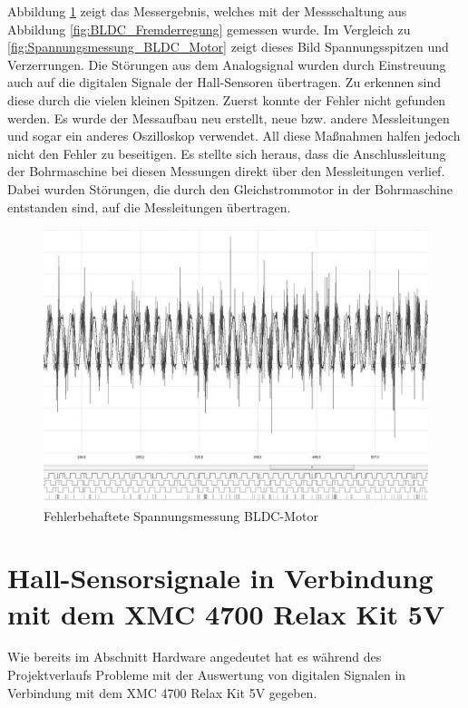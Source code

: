 Abbildung \ref{fig:Fehlerbehaftete_Spannungsmessung_BLDC_Motor} zeigt das Messergebnis, welches mit der Messschaltung aus Abbildung \ref{fig:BLDC_Fremderregung} gemessen wurde.
Im Vergleich zu \ref{fig:Spannungsmessung_BLDC_Motor} zeigt dieses Bild Spannungsspitzen und Verzerrungen.
Die Störungen aus dem Analogsignal wurden durch Einstreuung auch auf die digitalen Signale der Hall-Sensoren übertragen.
Zu erkennen sind diese durch die vielen kleinen Spitzen.
Zuerst konnte der Fehler nicht gefunden werden.
Es wurde der Messaufbau neu erstellt, neue bzw. andere Messleitungen und sogar ein anderes Oszilloskop verwendet.
All diese Maßnahmen halfen jedoch nicht den Fehler zu beseitigen.
Es stellte sich heraus, dass die Anschlussleitung der Bohrmaschine bei diesen Messungen direkt über den Messleitungen verlief.
Dabei wurden Störungen, die durch den Gleichstrommotor in der Bohrmaschine entstanden sind, auf die Messleitungen übertragen.


\begin{figure}[htbp]
	\centering
	\includegraphics[width=\textwidth-2cm]{tests/graphics/Fehlerhaftes_Spannungssignal}
	\caption{Fehlerbehaftete Spannungsmessung BLDC-Motor}
	\label{fig:Fehlerbehaftete_Spannungsmessung_BLDC_Motor}
\end{figure}


\section{Hall-Sensorsignale in Verbindung mit dem XMC 4700 Relax Kit 5V}
Wie bereits im Abschnitt Hardware angedeutet hat es während des Projektverlaufs Probleme mit der Auswertung von digitalen Signalen in Verbindung mit dem XMC 4700 Relax Kit 5V gegeben.

